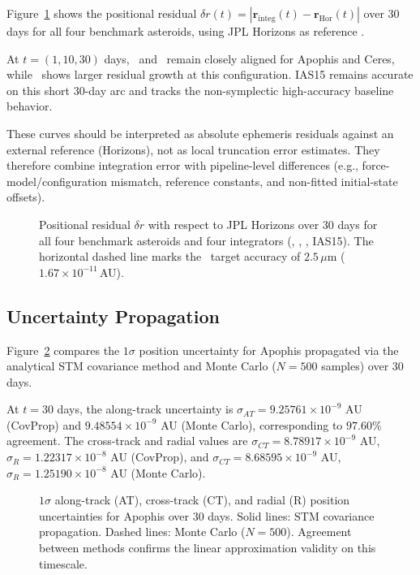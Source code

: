 Figure~\ref{fig:horizons_4integrators} shows the positional
residual $\delta r(t)=|\mathbf{r}_{\mathrm{integ}}(t)
-\mathbf{r}_{\mathrm{Hor}}(t)|$ over 30 days for all
four benchmark asteroids, using JPL Horizons as reference
\citep{giorgini1996}.

At $t=(1,10,30)$ days, \AAS\ and \rkf\ remain closely aligned for
Apophis and Ceres, while \saba\ shows larger residual growth at this
configuration. IAS15 remains accurate on this short 30-day arc and
tracks the non-symplectic high-accuracy baseline behavior.

These curves should be interpreted as absolute ephemeris residuals
against an external reference (Horizons), not as local truncation
error estimates. They therefore combine integration error with
pipeline-level differences (e.g., force-model/configuration mismatch,
reference constants, and non-fitted initial-state offsets).

\begin{figure}
\caption{
  Positional residual $\delta r$ with respect to JPL
  Horizons over 30 days for all four benchmark asteroids and
  four integrators (\AAS, \saba, \rkf, IAS15).
  The horizontal dashed line marks the \astdyn\ target
  accuracy of $2.5\,\mu$m ($1.67\times10^{-11}$\,AU).
  \label{fig:horizons_4integrators}
}
\end{figure}

\subsection{Uncertainty Propagation}
\label{sec:uncertainty}

Figure~\ref{fig:uncertainty} compares the $1\sigma$
position uncertainty for Apophis propagated via the
analytical STM covariance method and Monte Carlo
($N=500$ samples) over 30 days.

At $t=30$ days, the along-track uncertainty is
$\sigma_{AT}=9.25761\times10^{-9}$ AU (CovProp) and
$9.48554\times10^{-9}$ AU (Monte Carlo), corresponding to
$97.60\%$ agreement. The cross-track and radial values are
$\sigma_{CT}=8.78917\times10^{-9}$ AU,
$\sigma_{R}=1.22317\times10^{-8}$ AU (CovProp), and
$\sigma_{CT}=8.68595\times10^{-9}$ AU,
$\sigma_{R}=1.25190\times10^{-8}$ AU (Monte Carlo).

\begin{figure}
\caption{
  $1\sigma$ along-track (AT), cross-track (CT), and
  radial (R) position uncertainties for Apophis over
  30 days. Solid lines: STM covariance propagation.
  Dashed lines: Monte Carlo ($N = 500$). Agreement
  between methods confirms the linear approximation
  validity on this timescale.
  \label{fig:uncertainty}
}
\end{figure}

